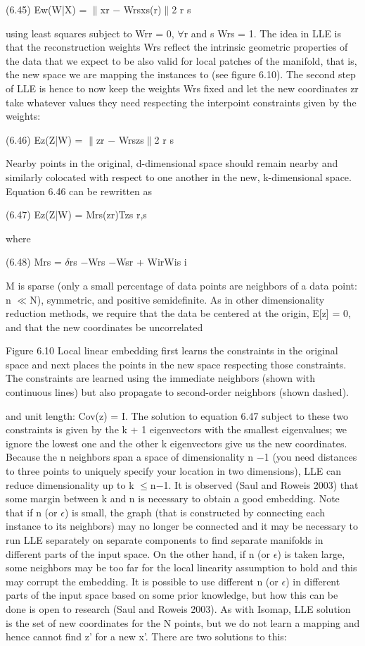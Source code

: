 (6.45) Ew(W|X) = $\parallel$xr $-$ Wrsxs(r)$\parallel$2 r s

using least squares subject to Wrr = 0, $\forall$r and s Wrs = 1. The idea in LLE is that the reconstruction weights Wrs reflect the intrinsic geometric properties of the data that we expect to be also valid for local patches of the manifold, that is, the new space we are mapping the instances to (see figure 6.10). The second step of LLE is hence to now keep the weights Wrs fixed and let the new coordinates zr take whatever values they need respecting the interpoint constraints given by the weights:

(6.46) Ez(Z|W) = $\parallel$zr $-$ Wrszs$\parallel$2 r s

Nearby points in the original, d-dimensional space should remain nearby and similarly colocated with respect to one another in the new, k-dimensional space. Equation 6.46 can be rewritten as

(6.47) Ez(Z|W) = Mrs(zr)Tzs r,s

where

(6.48) Mrs = $\delta$rs $-$Wrs $-$Wsr + WirWis i

M is sparse (only a small percentage of data points are neighbors of a data point: n $\ll$N), symmetric, and positive semidefinite. As in other dimensionality reduction methods, we require that the data be centered at the origin, E[z] = 0, and that the new coordinates be uncorrelated

Figure 6.10 Local linear embedding first learns the constraints in the original space and next places the points in the new space respecting those constraints. The constraints are learned using the immediate neighbors (shown with continuous lines) but also propagate to second-order neighbors (shown dashed).

and unit length: Cov(z) = I. The solution to equation 6.47 subject to these two constraints is given by the k + 1 eigenvectors with the smallest eigenvalues; we ignore the lowest one and the other k eigenvectors give us the new coordinates. Because the n neighbors span a space of dimensionality n $-$1 (you need distances to three points to uniquely specify your location in two dimensions), LLE can reduce dimensionality up to k $\leq$n$-$1. It is observed (Saul and Roweis 2003) that some margin between k and n is necessary to obtain a good embedding. Note that if n (or $\epsilon$) is small, the graph (that is constructed by connecting each instance to its neighbors) may no longer be connected and it may be necessary to run LLE separately on separate components to find separate manifolds in different parts of the input space. On the other hand, if n (or $\epsilon$) is taken large, some neighbors may be too far for the local linearity assumption to hold and this may corrupt the embedding. It is possible to use different n (or $\epsilon$) in different parts of the input space based on some prior knowledge, but how this can be done is open to research (Saul and Roweis 2003). As with Isomap, LLE solution is the set of new coordinates for the N points, but we do not learn a mapping and hence cannot find z' for a new x'. There are two solutions to this:

